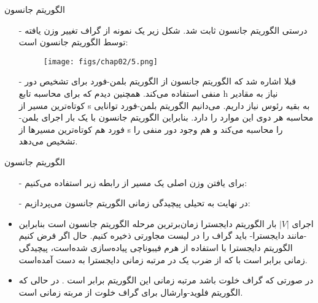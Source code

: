 \begin{frame}{الگوریتم جانسون}
	\begin{itemize}\itemr
		\item[-]
درستی الگوریتم جانسون ثابت شد. شکل زیر یک نمونه از گراف تغییر وزن یافته توسط الگوریتم جانسون است:
		\begin{figure}[h!]
			\centering
			\texttt{[image: figs/chap02/5.png]}
		\end{figure}

		\item[-]
قبلا اشاره شد که الگوریتم جانسون از الگوریتم بلمن-فورد برای تشخیص دور منفی استفاده می‌کند. همچنین دیدم که برای محاسبه تابع h نیاز به مقادیر کوتاه‌ترین مسیر از s به بقیه رئوس نیاز داریم. می‌دانیم الگوریتم بلمن-فورد توانایی محاسبه هر دوی این موارد را دارد. بنابراین الگوریتم جانسون با یک بار اجرای بلمن-فورد هم کوتاه‌ترین مسیرها از s را محاسبه می‌کند و هم وجود دور منفی را تشخیص می‌دهد.

	\end{itemize}
\end{frame}

\begin{frame}{الگوریتم جانسون}
	\begin{itemize}\itemr
		\item[-]
		برای یافتن وزن اصلی یک مسیر از رابطه زیر استفاده می‌کنیم:
		\begin{center}
		\end{center}

		\item[-]
		در نهایت به تحیلی پیچیدگی زمانی الگوریتم جانسون می‌پردازیم:
		\item
		اجرای $|V|$ بار الگوریتم دایجسترا زمان‌برترین مرحله الگوریتم جانسون است بنابراین -مانند دایجسترا- باید گراف را در لیست مجاورتی ذخیره کنیم. حال اگر فرض کنیم الگوریتم دایجسترا با استفاده از هرم فیبوناچی پیاده‌سازی شده‌است، پیچیدگی زمانی برابر است با
		که از ضرب یک
		در مرتبه زمانی دایجسترا به دست آمده‌است.
		\item
		در صورتی که گراف خلوت باشد مرتبه زمانی این الگوریتم برابر است
		.
		در حالی که الگوریتم فلوید-وارشال برای گراف خلوت از مربته زمانی
		است.

	\end{itemize}
\end{frame}